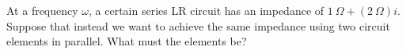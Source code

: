 At a frequency $\omega$, a certain series LR circuit has an impedance of $1\ \Omega+(2\ \Omega)i$.
Suppose that instead we want to achieve the same impedance using two circuit elements in parallel.
What must the elements be?
